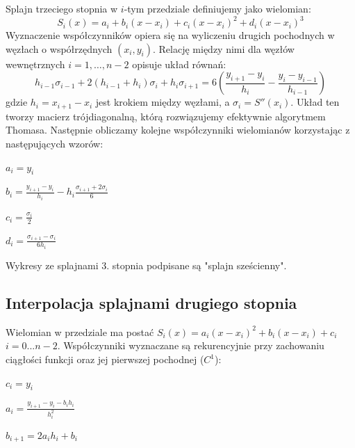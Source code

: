 \documentclass{article}
\begin{document}
Splajn trzeciego stopnia w $i$-tym przedziale definiujemy jako wielomian:
\begin{equation}
S_i(x) = a_i + b_i(x - x_i) + c_i(x - x_i)^2 + d_i(x - x_i)^3
\end{equation}
Wyznaczenie współczynników opiera się na wyliczeniu drugich pochodnych w węzłach o współrzędnych $(x_{i}, y_{i})$. Relację między nimi dla węzłów wewnętrznych $i = 1, \dots, n-2$ opisuje układ równań:
\begin{equation}
h_{i-1}\sigma_{i-1} + 2(h_{i-1} + h_i)\sigma_i + h_i\sigma_{i+1} = 6 \left( \frac{y_{i+1}-y_i}{h_i} - \frac{y_i-y_{i-1}}{h_{i-1}} \right)
\end{equation}
gdzie $h_i = x_{i+1} - x_i$ jest krokiem między węzłami, a $\sigma_i = S''(x_i)$. Układ ten tworzy macierz trójdiagonalną, którą rozwiązujemy efektywnie algorytmem Thomasa.
Następnie obliczamy kolejne współczynniki wielomianów korzystając z następujących wzorów:
\begin{itemize}
    \begin{Large}
    \item $a_i = y_i$
    \item $b_i = \frac{y_{i+1} - y_{i}}{h_i} - h_i \frac{\sigma_{i+1} + 2\sigma_{i}}{6}$
    \item $c_i = \frac{\sigma_i}{2}$
    \item $d_i = \frac{\sigma_{i+1} - \sigma_i}{6h_i}$
    \end{Large}
\end{itemize}

Wykresy ze splajnami 3. stopnia podpisane są "splajn sześcienny".

\subsection{Interpolacja splajnami drugiego stopnia }

Wielomian w przedziale ma postać $S_i(x) = a_i(x-x_i)^2 + b_i(x-x_i) + c_i$ $i=0...n-2 $. Współczynniki wyznaczane są rekurencyjnie przy zachowaniu ciągłości funkcji oraz jej pierwszej pochodnej ($C^1$):
\begin{itemize}
    \begin{Large}
    \item $c_i = y_i$
    \item $a_i = \frac{y_{i+1} - y_i - b_i h_i}{h_i^2}$
    \item $b_{i+1} = 2a_i h_i + b_i$
    \end{Large}
\end{itemize}
\end{document}

